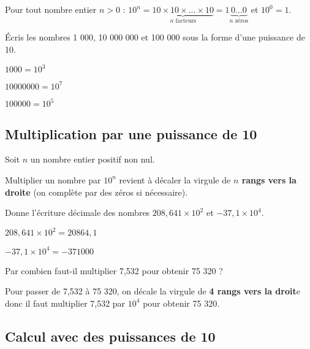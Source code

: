 \begin{definition}
Pour tout nombre entier $n > 0$ : $10^n=\underbrace{10 \times 10 \times ...\times 10}_{n \text{ facteurs}}=1\underbrace{0...0}_{n \text{ zéros}}$ et $10^0=1$. 

\end{definition}

\begin{exemple*1}
Écris les nombres 1 000, 10 000 000 et 100 000 sous la forme d’une puissance de 10.

\correction

$1 000 = 10^3$

$10 000 000 = 10^7$

$100 000 = 10^5$
\end{exemple*1}


\subsection{Multiplication par une puissance de 10}

\begin{aconnaitre}
Soit $n$ un nombre entier positif non nul.

Multiplier un nombre par $10^n$ revient à décaler la virgule de \textbf{$n$ rangs vers la droite} (on complète par des zéros si nécessaire).
\end{aconnaitre}

\begin{exemple*1}
Donne l'écriture décimale des nombres $208,641 \times 10^2$ et $-37,1 \times 10^4$.

\correction

$208,641 \times 10^2 = 20 864,1$ 

$-37,1 \times 10^4 = -371 000$
\end{exemple*1}


\begin{exemple*1}
Par combien faut-il multiplier 7,532 pour obtenir 75 320 ?

\correction

Pour passer de 7,532 à 75 320, on décale la virgule de \textbf{4 rangs vers la droit}e donc il faut multiplier 7,532 par $10^4$  pour obtenir 75 320.
\end{exemple*1}




\subsection{Calcul avec des puissances de 10}



